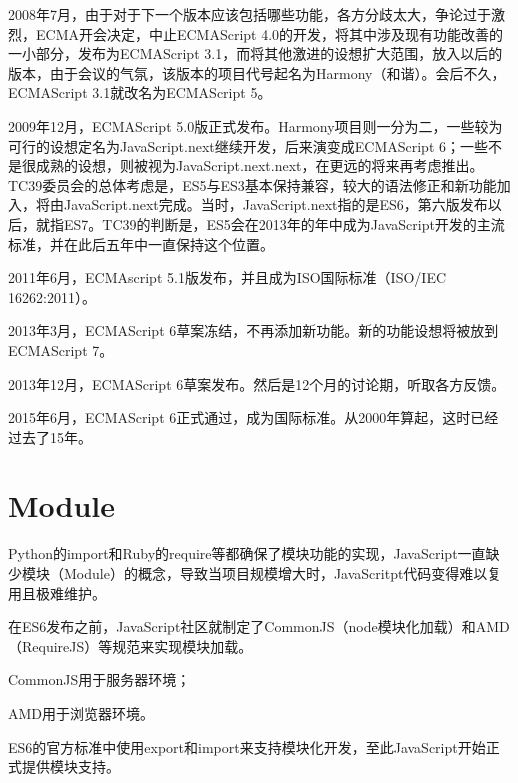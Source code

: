 2008年7月，由于对于下一个版本应该包括哪些功能，各方分歧太大，争论过于激烈，ECMA开会决定，中止ECMAScript 4.0的开发，将其中涉及现有功能改善的一小部分，发布为ECMAScript 3.1，而将其他激进的设想扩大范围，放入以后的版本，由于会议的气氛，该版本的项目代号起名为Harmony（和谐）。会后不久，ECMAScript 3.1就改名为ECMAScript 5。

2009年12月，ECMAScript 5.0版正式发布。Harmony项目则一分为二，一些较为可行的设想定名为JavaScript.next继续开发，后来演变成ECMAScript 6；一些不是很成熟的设想，则被视为JavaScript.next.next，在更远的将来再考虑推出。TC39委员会的总体考虑是，ES5与ES3基本保持兼容，较大的语法修正和新功能加入，将由JavaScript.next完成。当时，JavaScript.next指的是ES6，第六版发布以后，就指ES7。TC39的判断是，ES5会在2013年的年中成为JavaScript开发的主流标准，并在此后五年中一直保持这个位置。

2011年6月，ECMAscript 5.1版发布，并且成为ISO国际标准（ISO/IEC 16262:2011）。

2013年3月，ECMAScript 6草案冻结，不再添加新功能。新的功能设想将被放到ECMAScript 7。

2013年12月，ECMAScript 6草案发布。然后是12个月的讨论期，听取各方反馈。

2015年6月，ECMAScript 6正式通过，成为国际标准。从2000年算起，这时已经过去了15年。


\chapter{Module}

Python的import和Ruby的require等都确保了模块功能的实现，JavaScript一直缺少模块（Module）的概念，导致当项目规模增大时，JavaScritpt代码变得难以复用且极难维护。

在ES6发布之前，JavaScript社区就制定了CommonJS（node模块化加载）和AMD（RequireJS）等规范来实现模块加载。

\begin{compactitem}
\item CommonJS用于服务器环境；
\item AMD用于浏览器环境。
\end{compactitem}

ES6的官方标准中使用export和import来支持模块化开发，至此JavaScript开始正式提供模块支持。






\begin{lstlisting}[language=JavaScript]

\end{lstlisting}



